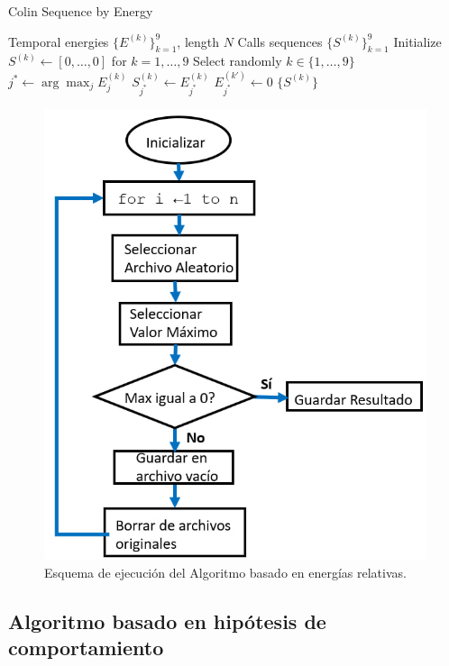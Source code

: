 \begin{algorithm}
    \caption{Colin Sequence by Energy}
    \begin{algorithmic}[1]
    \Require 
      Temporal energies \(\{E^{(k)}\}_{k=1}^9\), length \(N\)
    \Ensure
      Calls sequences \(\{S^{(k)}\}_{k=1}^9\)
    \State Initialize \(S^{(k)} \leftarrow [0,\dots,0]\) for \(k=1,\dots,9\)
      \State Select randomly \(k\in\{1,\dots,9\}\)
      \State \(j^* \leftarrow \arg\max_j E^{(k)}_j\)
      \State \(S^{(k)}_{j^*} \leftarrow E^{(k)}_{j^*}\)
        \State \(E^{(k')}_{j^*} \leftarrow 0\)
      \EndFor
    \EndWhile
    \State \Return \(\{S^{(k)}\}\)
    \end{algorithmic}
\end{algorithm}

\begin{figure}[ht]
    \centering
    \includegraphics[width=0.7\linewidth]{Graphics/algorithm.jpg}
    \caption{Esquema de ejecución del Algoritmo basado en energías relativas.}
    \label{fig:algorithm}
\end{figure}


\subsection{Algoritmo basado en hipótesis de comportamiento}
\label{alg_comportamiento}

